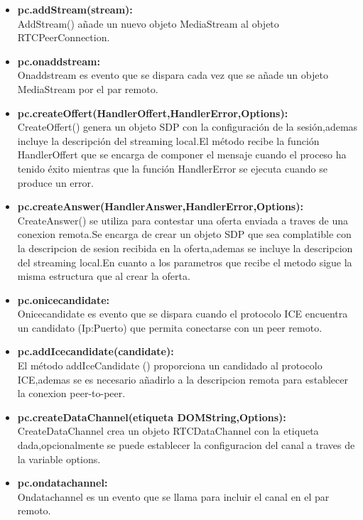 \begin{itemize}
\item \textbf{pc.addStream(stream):}
\\AddStream() añade un nuevo objeto MediaStream al objeto RTCPeerConnection.
\item \textbf{pc.onaddstream:}
\\Onaddstream es evento que se dispara cada vez que se añade un objeto MediaStream por el par remoto.
\item \textbf{pc.createOffert(HandlerOffert,HandlerError,Options):}
\\CreateOffert() genera un objeto SDP con la configuración de la sesión,ademas incluye la descripción del streaming local.El método recibe la función HandlerOffert que se encarga de componer el mensaje cuando el proceso ha tenido éxito mientras que la función HandlerError se ejecuta cuando se produce un error.
\item \textbf{pc.createAnswer(HandlerAnswer,HandlerError,Options):}
\\CreateAnswer() se utiliza para contestar una oferta enviada a traves de una conexion remota.Se encarga de crear un objeto SDP que sea complatible con la descripcion de sesion recibida en la oferta,ademas se incluye la descripcion del streaming local.En cuanto a los parametros que recibe el metodo sigue la misma estructura que al crear la oferta.
\item\textbf{pc.onicecandidate:}
\\Onicecandidate es evento que se dispara cuando el protocolo ICE encuentra un candidato (Ip:Puerto) que permita conectarse con un peer remoto.
\item\textbf{pc.addIcecandidate(candidate):}
\\El método addIceCandidate () proporciona un candidado al protocolo ICE,ademas se es necesario añadirlo a la descripcion remota para establecer la conexion peer-to-peer.
\item\textbf{pc.createDataChannel(etiqueta DOMString,Options):}
\\CreateDataChannel crea un objeto RTCDataChannel con la etiqueta dada,opcionalmente se puede establecer la configuracion del canal a traves de la variable options.
\item\textbf{pc.ondatachannel:}
\\Ondatachannel es un evento que se llama para incluir el canal en el par remoto.
\end{itemize}
